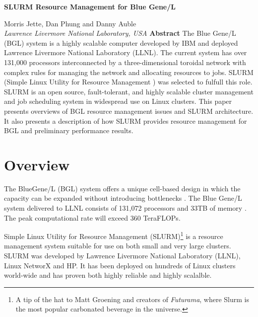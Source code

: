 \documentclass[10pt,onecolumn,times]{../common/llncs}
\def\ctit{SLURM Resource Management for Blue Gene/L}
\def\ucrl{UCRL-JC-TBD}
\def\auth{Morris Jette \\ Danny Auble \\ Dan Phung}
\def\pubdate{October 18, 2004}
\def\journal{Conference TBD}
\begin{document}

\vspace*{35mm}
\noindent\Large
\textbf{\ctit}
\baselineskip
\noindent\large
{Morris Jette, Dan Phung and Danny Auble \\
{\em Lawrence Livermore National Laboratory, USA}
\baselineskip
\noindent\large
\textbf{Abstract}
\baselineskip
\noindent\normalsize
The Blue Gene/L (BGL) system is a highly scalable computer developed
by IBM and deployed Lawrence Livermore National Laboratory (LLNL).
The current system has over 131,000 processors interconnected by a
three-dimensional toroidal network with complex rules for managing
the network and allocating resources to jobs.
SLURM (Simple Linux Utility for Resource Management ) was selected to
fulfull this role.
SLURM is an open source, fault-tolerant, and highly scalable cluster
management and job scheduling system in widespread use on Linux clusters.
This paper presents overviews of BGL resource management issues and
SLURM architecture.
It also presents a description of how SLURM provides resource
management for BGL and preliminary performance results.

\newcommand{\munged}{{\tt munged}}
\newcommand{\srun}{{\tt srun}}
\newcommand{\scancel}{{\tt scancel}}
\newcommand{\squeue}{{\tt squeue}}
\newcommand{\scontrol}{{\tt scontrol}}
\newcommand{\sinfo}{{\tt sinfo}}
\newcommand{\slurmctld}{{\tt slurmctld}}
\newcommand{\slurmd}{{\tt slurmd}}
\newcommand{\smap}{{\tt smap}}

\section{Overview}

The BlueGene/L (BGL) system offers a unique cell-based design in which
the capacity can be expanded without introducing bottlenecks
\cite{BlueGeneWeb,BlueGeneL2002}.
The Blue Gene/L system delivered to LLNL consists of
131,072 processors and 33TB of memory \cite{BlueGene2002}.
The peak computational rate will exceed 360 TeraFLOPs.

Simple Linux Utility for Resource Management (SLURM)\footnote{A tip of
the hat to Matt Groening and creators of {\em Futurama},
where Slurm is the most popular carbonated beverage in the universe.}
is a resource management system suitable for use on both small and
very large clusters.
SLURM was developed by Lawrence Livermore National Laboratory
(LLNL), Linux NetworX and HP.
It has been deployed on hundreds of Linux clusters world-wide and has
proven both highly reliable and highly scalalble.

}
\end{document}

